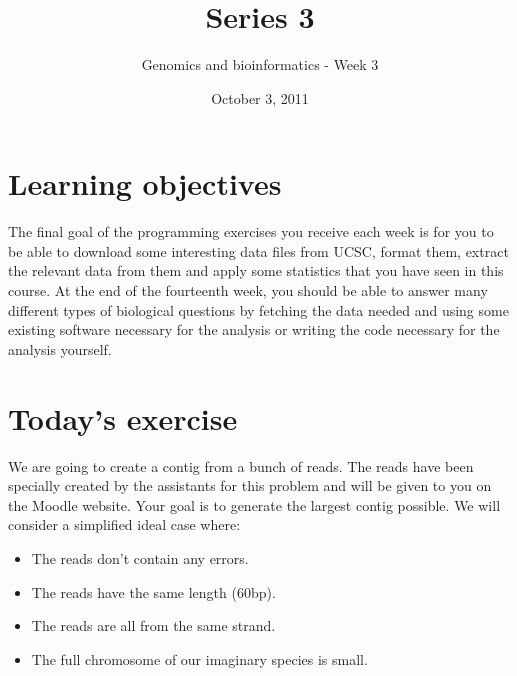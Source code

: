 \documentclass[a4paper,11pt]{article}
\title{Series 3}
\date{October 3, 2011}
\author{Genomics and bioinformatics - Week 3}
\begin{document}
\maketitle

\section{Learning objectives}
The final goal of the programming exercises you receive each week is for you to be able to download some interesting data files from UCSC, format them, extract the relevant data from them and apply some statistics that you have seen in this course. At the end of the fourteenth week, you should be able to answer many different types of biological questions by fetching the data needed and using some existing software necessary for the analysis or writing the code necessary for the analysis yourself.

\section{Today's exercise}
We are going to create a contig from a bunch of reads. The reads have been specially created by the assistants for this problem and will be given to you on the Moodle website. Your goal is to generate the largest contig possible. We will consider a simplified ideal case where:
\begin{itemize}
\item The reads don't contain any errors.
\item The reads have the same length (60bp).
\item The reads are all from the same strand.
\item The full chromosome of our imaginary species is small.
\end{itemize}
\end{document}

